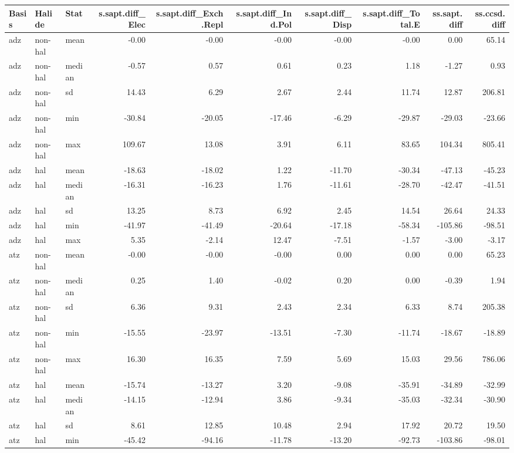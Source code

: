 \begin{table}[ht]
\centering
\scriptsize
\begin{tabular}{lllrrrrrrr}
  \hline
Basis & Halide & Stat & s.sapt.diff\_Elec & s.sapt.diff\_Exch.Repl & s.sapt.diff\_Ind.Pol & s.sapt.diff\_Disp & s.sapt.diff\_Total.E & ss.sapt.diff & ss.ccsd.diff \\ 
  \hline
adz & non-hal & mean & -0.00 & -0.00 & -0.00 & -0.00 & -0.00 & 0.00 & 65.14 \\ 
  adz & non-hal & median & -0.57 & 0.57 & 0.61 & 0.23 & 1.18 & -1.27 & 0.93 \\ 
  adz & non-hal & sd & 14.43 & 6.29 & 2.67 & 2.44 & 11.74 & 12.87 & 206.81 \\ 
  adz & non-hal & min & -30.84 & -20.05 & -17.46 & -6.29 & -29.87 & -29.03 & -23.66 \\ 
  adz & non-hal & max & 109.67 & 13.08 & 3.91 & 6.11 & 83.65 & 104.34 & 805.41 \\ 
  adz & hal & mean & -18.63 & -18.02 & 1.22 & -11.70 & -30.34 & -47.13 & -45.23 \\ 
  adz & hal & median & -16.31 & -16.23 & 1.76 & -11.61 & -28.70 & -42.47 & -41.51 \\ 
  adz & hal & sd & 13.25 & 8.73 & 6.92 & 2.45 & 14.54 & 26.64 & 24.33 \\ 
  adz & hal & min & -41.97 & -41.49 & -20.64 & -17.18 & -58.34 & -105.86 & -98.51 \\ 
  adz & hal & max & 5.35 & -2.14 & 12.47 & -7.51 & -1.57 & -3.00 & -3.17 \\ 
  atz & non-hal & mean & -0.00 & -0.00 & -0.00 & 0.00 & 0.00 & 0.00 & 65.23 \\ 
  atz & non-hal & median & 0.25 & 1.40 & -0.02 & 0.20 & 0.00 & -0.39 & 1.94 \\ 
  atz & non-hal & sd & 6.36 & 9.31 & 2.43 & 2.34 & 6.33 & 8.74 & 205.38 \\ 
  atz & non-hal & min & -15.55 & -23.97 & -13.51 & -7.30 & -11.74 & -18.67 & -18.89 \\ 
  atz & non-hal & max & 16.30 & 16.35 & 7.59 & 5.69 & 15.03 & 29.56 & 786.06 \\ 
  atz & hal & mean & -15.74 & -13.27 & 3.20 & -9.08 & -35.91 & -34.89 & -32.99 \\ 
  atz & hal & median & -14.15 & -12.94 & 3.86 & -9.34 & -35.03 & -32.34 & -30.90 \\ 
  atz & hal & sd & 8.61 & 12.85 & 10.48 & 2.94 & 17.92 & 20.72 & 19.50 \\ 
  atz & hal & min & -45.42 & -94.16 & -11.78 & -13.20 & -92.73 & -103.86 & -98.01 \\ 

\end{tabular}
\end{table}

